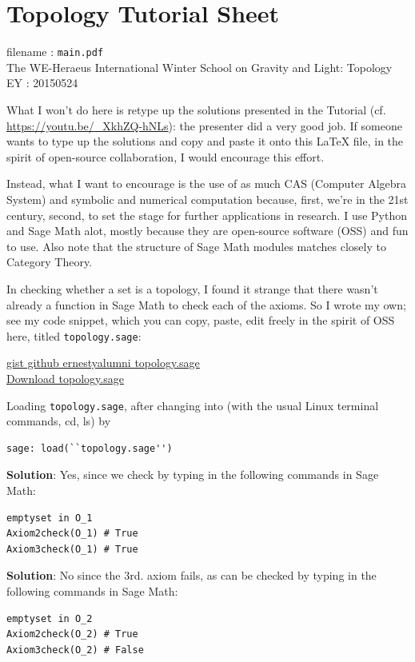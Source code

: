 \section*{Topology Tutorial Sheet}
filename : \texttt{main.pdf} \\
The WE-Heraeus International Winter School on Gravity and Light: Topology \\

EY : 20150524  

What I won't do here is retype up the solutions presented in the Tutorial (cf. \url{https://youtu.be/_XkhZQ-hNLs}): the presenter did a very good job.  If someone wants to type up the solutions and copy and paste it onto this LaTeX file, in the spirit of open-source collaboration, I would encourage this effort. 

Instead, what I want to encourage is the use of as much CAS (Computer Algebra System) and symbolic and numerical computation because, first, we're in the 21st century, second, to set the stage for further applications in research.  I use Python and Sage Math alot, mostly because they are open-source software (OSS) and fun to use.  Also note that the structure of Sage Math modules matches closely to Category Theory.  

In checking whether a set is a topology, I found it strange that there wasn't already a function in Sage Math to check each of the axioms.  So I wrote my own; see my code snippet, which you can copy, paste, edit freely in the spirit of OSS here, titled \texttt{topology.sage}: 

\href{https://gist.github.com/ernestyalumni/903eefd01be1f214598b}{gist github ernestyalumni topology.sage} \\
\href{https://gist.githubusercontent.com/ernestyalumni/903eefd01be1f214598b/raw/67083e3b3dec2faf2087713236b413b741bd1180/topology.sage}{Download topology.sage}

Loading \texttt{topology.sage}, after changing into (with the usual Linux terminal commands, cd, ls) by 
\begin{lstlisting}[frame=single]
sage: load(``topology.sage'')
\end{lstlisting}



\textbf{Solution}: Yes, since we check by typing in the following commands in Sage Math:

\begin{lstlisting}[frame=single]
emptyset in O_1
Axiom2check(O_1) # True
Axiom3check(O_1) # True
\end{lstlisting}


\textbf{Solution}: No since the 3rd. axiom fails, as can be checked by typing in the following commands in Sage Math:
\begin{lstlisting}[frame=single]
emptyset in O_2
Axiom2check(O_2) # True
Axiom3check(O_2) # False
\end{lstlisting}
